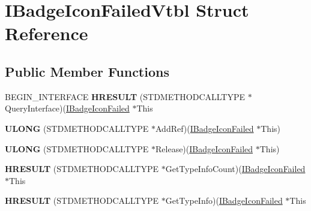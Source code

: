 \hypertarget{struct_i_badge_icon_failed_vtbl}{\section{I\-Badge\-Icon\-Failed\-Vtbl Struct Reference}
\label{struct_i_badge_icon_failed_vtbl}
}
\subsection*{Public Member Functions}
\begin{DoxyCompactItemize}
\item 
\hypertarget{struct_i_badge_icon_failed_vtbl_a4468eb636787d0f0bf1635a50050a445}{B\-E\-G\-I\-N\-\_\-\-I\-N\-T\-E\-R\-F\-A\-C\-E {\bfseries H\-R\-E\-S\-U\-L\-T} (S\-T\-D\-M\-E\-T\-H\-O\-D\-C\-A\-L\-L\-T\-Y\-P\-E $\ast$Query\-Interface)(\hyperlink{interface_i_badge_icon_failed}{I\-Badge\-Icon\-Failed} $\ast$This}\label{struct_i_badge_icon_failed_vtbl_a4468eb636787d0f0bf1635a50050a445}

\item 
\hypertarget{struct_i_badge_icon_failed_vtbl_a4a2031aa3c97b7e6bee5fe56c6682fa6}{{\bfseries U\-L\-O\-N\-G} (S\-T\-D\-M\-E\-T\-H\-O\-D\-C\-A\-L\-L\-T\-Y\-P\-E $\ast$Add\-Ref)(\hyperlink{interface_i_badge_icon_failed}{I\-Badge\-Icon\-Failed} $\ast$This)}\label{struct_i_badge_icon_failed_vtbl_a4a2031aa3c97b7e6bee5fe56c6682fa6}

\item 
\hypertarget{struct_i_badge_icon_failed_vtbl_a3f1903baa9a54d19b28f43dfb8dff4ce}{{\bfseries U\-L\-O\-N\-G} (S\-T\-D\-M\-E\-T\-H\-O\-D\-C\-A\-L\-L\-T\-Y\-P\-E $\ast$Release)(\hyperlink{interface_i_badge_icon_failed}{I\-Badge\-Icon\-Failed} $\ast$This)}\label{struct_i_badge_icon_failed_vtbl_a3f1903baa9a54d19b28f43dfb8dff4ce}

\item 
\hypertarget{struct_i_badge_icon_failed_vtbl_a0a77ef9900763bf47c141a8e328d4f69}{{\bfseries H\-R\-E\-S\-U\-L\-T} (S\-T\-D\-M\-E\-T\-H\-O\-D\-C\-A\-L\-L\-T\-Y\-P\-E $\ast$Get\-Type\-Info\-Count)(\hyperlink{interface_i_badge_icon_failed}{I\-Badge\-Icon\-Failed} $\ast$This}\label{struct_i_badge_icon_failed_vtbl_a0a77ef9900763bf47c141a8e328d4f69}

\item 
\hypertarget{struct_i_badge_icon_failed_vtbl_a899a96ee6b5b11ad695c739da6734eed}{{\bfseries H\-R\-E\-S\-U\-L\-T} (S\-T\-D\-M\-E\-T\-H\-O\-D\-C\-A\-L\-L\-T\-Y\-P\-E $\ast$Get\-Type\-Info)(\hyperlink{interface_i_badge_icon_failed}{I\-Badge\-Icon\-Failed} $\ast$This}\label{struct_i_badge_icon_failed_vtbl_a899a96ee6b5b11ad695c739da6734eed}


\end{DoxyCompactItemize}
